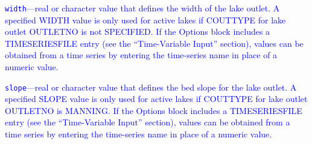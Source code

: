 \begin{description}
\item \textcolor{blue}{\texttt{width}---real or character value that defines the width of the lake outlet. A specified WIDTH value is only used for active lakes if COUTTYPE for lake outlet OUTLETNO is not SPECIFIED. If the Options block includes a TIMESERIESFILE entry (see the ``Time-Variable Input'' section), values can be obtained from a time series by entering the time-series name in place of a numeric value.}

\item \textcolor{blue}{\texttt{slope}---real or character value that defines the bed slope for the lake outlet. A specified SLOPE value is only used for active lakes if COUTTYPE for lake outlet OUTLETNO is MANNING. If the Options block includes a TIMESERIESFILE entry (see the ``Time-Variable Input'' section), values can be obtained from a time series by entering the time-series name in place of a numeric value.}

\end{description}


